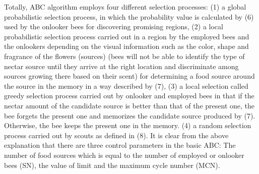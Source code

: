 \documentclass[pdftex,11pt]{article}
\begin{document}
Totally, ABC algorithm employs four different selection processes: (1) a global probabilistic selection process, in which the probability value is calculated by (6) used by the onlooker bees for discovering promising regions, (2) a local probabilistic selection process carried out in a region by the employed bees and the onlookers depending on the visual information such as the color, shape and fragrance of the flowers (sources) (bees will not be able to identify the type of nectar source until they arrive at the right location and discriminate among sources growing there based on their scent) for determining a food source around the source in the memory in a way described by (7), (3) a local selection called greedy selection process carried out by onlooker and employed bees in that if the nectar amount of the candidate source is better than that of the present one, the bee forgets the present one and memorizes the candidate source produced by (7). Otherwise, the bee keeps the present one in the memory. (4) a random selection process carried out by scouts as defined in (8).
It is clear from the above explanation that there are three control parameters in the basic ABC: The number of food sources
which is equal to the number of employed or onlooker bees (SN), the value of limit and the maximum cycle number (MCN).
\end{document}
